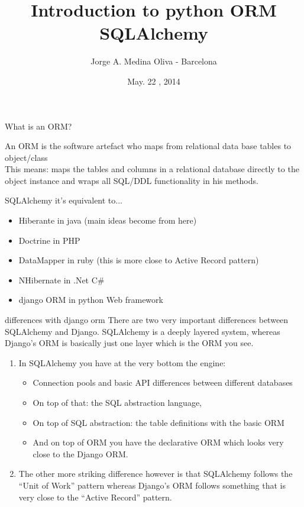 \documentclass[seagull]{beamer}
\title{Introduction to python ORM SQLAlchemy}
\author{
	Jorge A. Medina Oliva - Barcelona
}
\institute{http://pybcn.org}
\date{May. 22 , 2014}
\begin{document}
\begin{frame}
\titlepage
\end{frame}


\begin{frame}{What is an ORM?}

An ORM is the software artefact who maps from relational data base tables to object/class\\
This means: maps the tables and  columns in a relational database directly to the object instance and wraps all SQL/DDL functionality in his methods.
\end{frame}

\begin{frame}{SQLAlchemy it's equivalent to...}
\begin{itemize}
	\item Hiberante in java (main ideas become from here)
	\item Doctrine in PHP
	\item DataMapper in ruby (this is more close to Active Record pattern)
	\item NHibernate in .Net C\#
	\item django ORM in python Web framework
\end{itemize}
\end{frame}

\begin{frame}{differences with django orm}
	There are two very important differences between SQLAlchemy and Django. SQLAlchemy is a deeply layered 	system, whereas Django's ORM is basically just one layer which is the ORM you see. 
	\begin{enumerate}
	\item In SQLAlchemy you have at the very bottom the engine:
		\begin{itemize}
			\item Connection pools and basic API differences between different databases
			\item On top of that: the SQL abstraction language,
			\item On top of SQL abstraction: the table definitions with the basic ORM 
			\item And on top of ORM you have the declarative ORM which looks very close to the Django ORM. 
		\end{itemize}
	\item The other more striking difference however is that SQLAlchemy follows the “Unit of Work” pattern whereas Django's ORM follows something that is very close to the “Active Record” pattern.
	\end{enumerate}
\end{frame}
\end{document}

